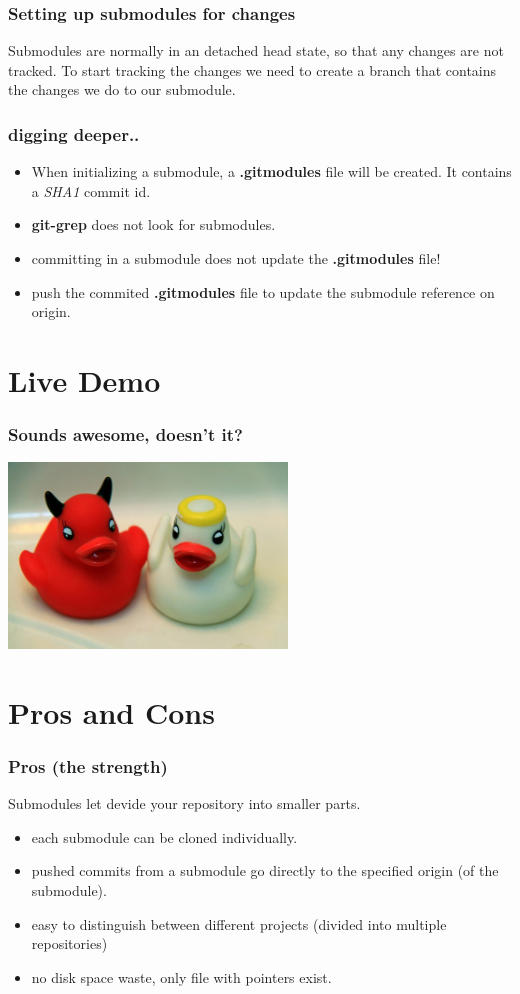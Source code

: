 \documentclass[10pt]{beamer}
\begin{document}
\begin{frame}[fragile]
  \frametitle{Setting up submodules for changes}
   Submodules are normally in an detached head state, so that any changes are not tracked. To start tracking the changes we need to create a branch that contains the changes we do to our submodule.

\end{frame}

\begin{frame}
	\frametitle{digging deeper..}
	\begin{itemize}
		\item When initializing a submodule, a \textbf{.gitmodules} file will be created. It contains a \emph{SHA1} commit id.
		\item \textbf{git-grep} does not look for submodules.
		\item committing in a submodule does not update the \textbf{.gitmodules} file!
		\item push the commited \textbf{.gitmodules} file to update the submodule reference on origin.
	\end{itemize}
\end{frame}

\section{Live Demo}

\begin{frame}
	\frametitle{Sounds awesome, doesn't it?}
\begin{center}\includegraphics[width=280px]{images/goodbad.jpg}\end{center}
\end{frame}

\section{Pros and Cons}

\begin{frame}
  \frametitle{Pros (the strength)}
  	Submodules let devide your repository into smaller parts.
	\begin{itemize}
		\item each submodule can be cloned individually.
		\item pushed commits from a submodule go directly to the specified origin (of the submodule).
		\item easy to distinguish between different projects (divided into multiple repositories)
		\item no disk space waste, only file with pointers exist.
	\end{itemize}
\end{frame}
\end{document}
